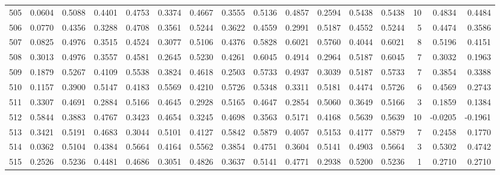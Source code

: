 \begin{tabular}{lrrrrrrrrrrrrrrr}
505 &      0.0604 &  0.5088 &  0.4401 &  0.4753 &  0.3374 &  0.4667 &  0.3555 &  0.5136 &  0.4857 &  0.2594 &   0.5438 &     0.5438 &     10 &                    0.4834 &                     0.4484 \\
506 &      0.0770 &  0.4356 &  0.3288 &  0.4708 &  0.3561 &  0.5244 &  0.3622 &  0.4559 &  0.2991 &  0.5187 &   0.4552 &     0.5244 &      5 &                    0.4474 &                     0.3586 \\
507 &      0.0825 &  0.4976 &  0.3515 &  0.4524 &  0.3077 &  0.5106 &  0.4376 &  0.5828 &  0.6021 &  0.5760 &   0.4044 &     0.6021 &      8 &                    0.5196 &                     0.4151 \\
508 &      0.3013 &  0.4976 &  0.3557 &  0.4581 &  0.2645 &  0.5230 &  0.4261 &  0.6045 &  0.4914 &  0.2964 &   0.5187 &     0.6045 &      7 &                    0.3032 &                     0.1963 \\
509 &      0.1879 &  0.5267 &  0.4109 &  0.5538 &  0.3824 &  0.4618 &  0.2503 &  0.5733 &  0.4937 &  0.3039 &   0.5187 &     0.5733 &      7 &                    0.3854 &                     0.3388 \\
510 &      0.1157 &  0.3900 &  0.5147 &  0.4183 &  0.5569 &  0.4210 &  0.5726 &  0.5348 &  0.3311 &  0.5181 &   0.4474 &     0.5726 &      6 &                    0.4569 &                     0.2743 \\
511 &      0.3307 &  0.4691 &  0.2884 &  0.5166 &  0.4645 &  0.2928 &  0.5165 &  0.4647 &  0.2854 &  0.5060 &   0.3649 &     0.5166 &      3 &                    0.1859 &                     0.1384 \\
512 &      0.5844 &  0.3883 &  0.4767 &  0.3423 &  0.4654 &  0.3245 &  0.4698 &  0.3563 &  0.5171 &  0.4168 &   0.5639 &     0.5639 &     10 &                   -0.0205 &                    -0.1961 \\
513 &      0.3421 &  0.5191 &  0.4683 &  0.3044 &  0.5101 &  0.4127 &  0.5842 &  0.5879 &  0.4057 &  0.5153 &   0.4177 &     0.5879 &      7 &                    0.2458 &                     0.1770 \\
514 &      0.0362 &  0.5104 &  0.4384 &  0.5664 &  0.4164 &  0.5562 &  0.3854 &  0.4751 &  0.3604 &  0.5141 &   0.4903 &     0.5664 &      3 &                    0.5302 &                     0.4742 \\
515 &      0.2526 &  0.5236 &  0.4481 &  0.4686 &  0.3051 &  0.4826 &  0.3637 &  0.5141 &  0.4771 &  0.2938 &   0.5200 &     0.5236 &      1 &                    0.2710 &                     0.2710 \\

\end{tabular}
